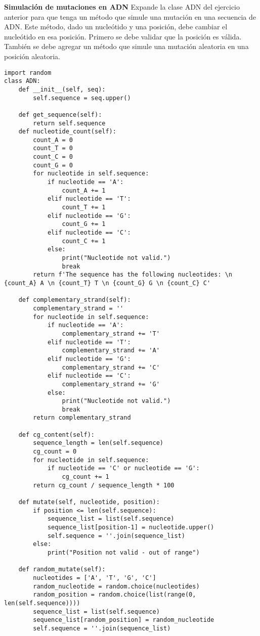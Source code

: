 \documentclass{config/ejercicios}
\begin{document}
\begin{problemS} \textbf{Simulación de mutaciones en ADN}
Expande la clase ADN del ejercicio anterior para que tenga un método que simule una mutación en una secuencia de ADN. Este método, dado un nucleótido y una posición, debe cambiar el nucleótido en esa posición.  Primero se debe validar que la posición es válida. También se debe agregar un método que simule una mutación aleatoria en una posición aleatoria.
\begin{lstlisting}
import random
class ADN:
    def __init__(self, seq):
        self.sequence = seq.upper()

    def get_sequence(self):
        return self.sequence
    def nucleotide_count(self):
        count_A = 0
        count_T = 0
        count_C = 0
        count_G = 0
        for nucleotide in self.sequence:
            if nucleotide == 'A':
                count_A += 1
            elif nucleotide == 'T':
                count_T += 1
            elif nucleotide == 'G':
                count_G += 1
            elif nucleotide == 'C':
                count_C += 1
            else:
                print("Nucleotide not valid.")
                break
        return f'The sequence has the following nucleotides: \n {count_A} A \n {count_T} T \n {count_G} G \n {count_C} C'

    def complementary_strand(self):
        complementary_strand = ''
        for nucleotide in self.sequence:
            if nucleotide == 'A':
                complementary_strand += 'T'
            elif nucleotide == 'T':
                complementary_strand += 'A'
            elif nucleotide == 'G':
                complementary_strand += 'C'
            elif nucleotide == 'C':
                complementary_strand += 'G'
            else:
                print("Nucleotide not valid.")
                break
        return complementary_strand

    def cg_content(self):
        sequence_length = len(self.sequence)
        cg_count = 0
        for nucleotide in self.sequence:
            if nucleotide == 'C' or nucleotide == 'G':
                cg_count += 1
        return cg_count / sequence_length * 100

    def mutate(self, nucleotide, position):
        if position <= len(self.sequence):
            sequence_list = list(self.sequence)
            sequence_list[position-1] = nucleotide.upper()
            self.sequence = ''.join(sequence_list)
        else:
            print("Position not valid - out of range")

    def random_mutate(self):
        nucleotides = ['A', 'T', 'G', 'C']
        random_nucleotide = random.choice(nucleotides)
        random_position = random.choice(list(range(0, len(self.sequence))))
        sequence_list = list(self.sequence)
        sequence_list[random_position] = random_nucleotide
        self.sequence = ''.join(sequence_list)
\end{lstlisting}
\end{problemS}
\end{document}
